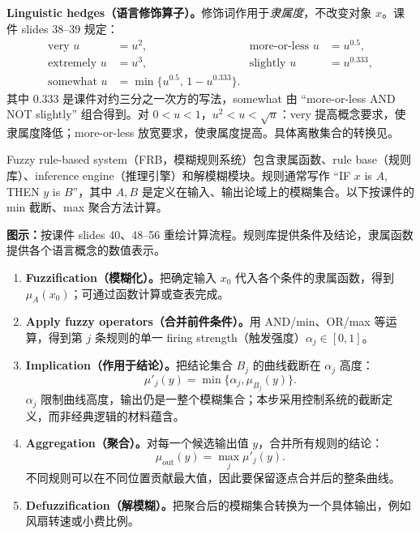 \textbf{Linguistic hedges（语言修饰算子）。}修饰词作用于\emph{隶属度}，不改变对象 $x$。课件 slides 38--39 规定：
\[
 \begin{aligned}
  \text{very }u&=u^2,&\text{more-or-less }u&=u^{0.5},\\
  \text{extremely }u&=u^3,&\text{slightly }u&=u^{0.333},\\
  \text{somewhat }u&=\min\{u^{0.5},\,1-u^{0.333}\}.&&
 \end{aligned}
\]
其中 $0.333$ 是课件对约三分之一次方的写法，somewhat 由 ``more-or-less AND NOT slightly'' 组合得到。对 $0<u<1$，$u^2<u<\sqrt u$：very 提高概念要求，使隶属度降低；more-or-less 放宽要求，使隶属度提高。具体离散集合的转换见。


Fuzzy rule-based system（FRB，模糊规则系统）包含隶属函数、rule base（规则库）、inference engine（推理引擎）和解模糊模块。规则通常写作 ``IF $x$ is $A$, THEN $y$ is $B$''，其中 $A,B$ 是定义在输入、输出论域上的模糊集合。以下按课件的 min 截断、max 聚合方法计算。

\begin{center}

\end{center}
\textbf{图示：}按课件 slides 40、48--56 重绘计算流程。规则库提供条件及结论，隶属函数提供各个语言概念的数值表示。

\begin{enumerate}
 \item \textbf{Fuzzification（模糊化）。}把确定输入 $x_0$ 代入各个条件的隶属函数，得到 $\mu_A(x_0)$；可通过函数计算或查表完成。
 \item \textbf{Apply fuzzy operators（合并前件条件）。}用 AND/min、OR/max 等运算，得到第 $j$ 条规则的单一 firing strength（触发强度）$\alpha_j\in[0,1]$。
 \item \textbf{Implication（作用于结论）。}把结论集合 $B_j$ 的曲线截断在 $\alpha_j$ 高度：
 \[
  \mu'_j(y)=\min\{\alpha_j,\mu_{B_j}(y)\}.
 \]
 $\alpha_j$ 限制曲线高度，输出仍是一整个模糊集合；本步采用控制系统的截断定义，而非经典逻辑的材料蕴含。
 \item \textbf{Aggregation（聚合）。}对每一个候选输出值 $y$，合并所有规则的结论：
 \[
  \mu_{\mathrm{out}}(y)=\max_j\mu'_j(y).
 \]
 不同规则可以在不同位置贡献最大值，因此要保留逐点合并后的整条曲线。
 \item \textbf{Defuzzification（解模糊）。}把聚合后的模糊集合转换为一个具体输出，例如风扇转速或小费比例。
\end{enumerate}

